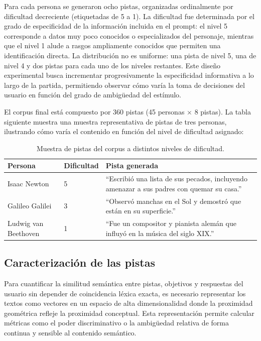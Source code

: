 \documentclass[../main.tex]{subfiles}
\begin{document}
Para cada persona se generaron ocho pistas, organizadas ordinalmente por dificultad decreciente (etiquetadas de 5 a 1). La dificultad fue determinada por el grado de especificidad de la información incluida en el prompt: el nivel 5 corresponde a datos muy poco conocidos o especializados del personaje, mientras que el nivel 1 alude a rasgos ampliamente conocidos que permiten una identificación directa. La distribución no es uniforme: una pista de nivel 5, una de nivel 4 y dos pistas para cada uno de los niveles restantes. Este diseño experimental busca incrementar progresivamente la especificidad informativa a lo largo de la partida, permitiendo observar cómo varía la toma de decisiones del usuario en función del grado de ambigüedad del estímulo.

El corpus final está compuesto por 360 pistas (45 personas $\times$ 8 pistas). La tabla siguiente muestra una muestra representativa de pistas de tres personas, ilustrando cómo varía el contenido en función del nivel de dificultad asignado:

\begin{table}[H]
\centering
\begin{tabular}{llp{9cm}}
\hline
\textbf{Persona} & \textbf{Dificultad} & \textbf{Pista generada} \\
\hline
Isaac Newton & 5 & ``Escribió una lista de sus pecados, incluyendo amenazar a sus padres con quemar su casa.'' \\
Galileo Galilei & 3 & ``Observó manchas en el Sol y demostró que están en su superficie.'' \\
Ludwig van Beethoven & 1 & ``Fue un compositor y pianista alemán que influyó en la música del siglo XIX.'' \\
\hline
\end{tabular}
\caption{Muestra de pistas del corpus a distintos niveles de dificultad.}
\label{tab:muestra_pistas}
\end{table}

\subsection{Caracterización de las pistas}

Para cuantificar la similitud semántica entre pistas, objetivos y respuestas del usuario sin depender de coincidencia léxica exacta, es necesario representar los textos como vectores en un espacio de alta dimensionalidad donde la proximidad geométrica refleje la proximidad conceptual. Esta representación permite calcular métricas como el poder discriminativo o la ambigüedad relativa de forma continua y sensible al contenido semántico.
\end{document}
